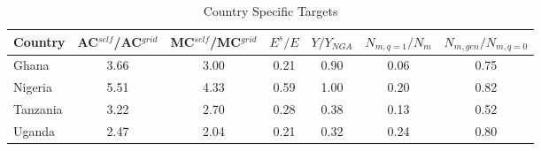 \begin{table}[H] 
\center 
\singlespace 
\caption{Country Specific Targets} \label{country_moments}
\vspace{-.1in} 
\begin{tabular}{l c c c c c c}\hline 
\hline 
 {Country} & AC$^{self}$/AC$^{grid}$  & MC$^{self}$/MC$^{grid}$ & $E^s/E$ & $Y/Y_{NGA}$ & $N_{m,q=1}/N_m$ &$N_{m,gen}/N_{m,q=0}$ \\  
\hline 
Ghana  &     3.66 &     3.00 &     0.21   &     0.90  &     0.06&     0.75\\  Nigeria  &     5.51 &     4.33 &     0.59  &     1.00   &     0.20&     0.82\\  Tanzania &     3.22 &     2.70 &     0.28  &     0.38  &     0.13 &     0.52\\  Uganda &     2.47 &     2.04 &     0.21  &     0.32  &     0.24&     0.80\\  \hline 
\end{tabular}
\end{table} 
